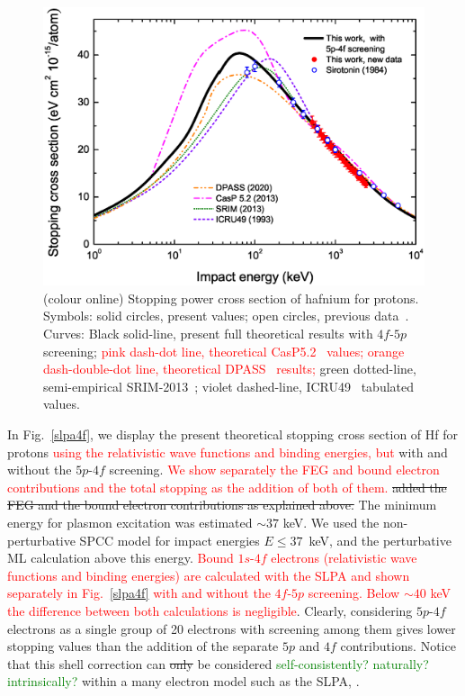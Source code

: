 \documentclass[aps,pra,reprint,superscriptaddress]{revtex4-1}
\def\clau#1{\textcolor{red}{#1}}
\def\duda#1{\textcolor{green}{#1}}
\begin{document}
\begin{figure}[!t]
\centering
\includegraphics[width=13.0cm]{Fig03_new2.eps}
\caption{(colour online) Stopping power cross section of hafnium for protons. Symbols: 
solid circles, present values; open circles, previous data~\cite{Sirotinin}. 
Curves: Black solid-line, present full theoretical results with 
$4f$-$5p$ screening; \clau{pink dash-dot line, theoretical CasP5.2~\cite{Grande,casp52} values; orange dash-double-dot line, theoretical DPASS~\cite{DPASS20} results; } green dotted-line, semi-empirical SRIM-2013~\cite{Ziegler01}; violet dashed-line, ICRU49~\cite{ICRU49} tabulated values.}
\label{F03}
\end{figure}

In Fig.~\ref{slpa4f}, we display the present theoretical stopping cross
section of Hf for protons \clau{using the relativistic wave functions and binding energies, but} with and without the $5p$-$4f$ screening. \clau{We show separately the FEG and bound electron contributions and the total stopping as the addition of both of them.}
\st{added the FEG and the bound electron contributions as explained above. }
The minimum energy for plasmon excitation was estimated $\sim 37$ keV. We
used the non-perturbative SPCC model for impact energies $E \leq 37$~keV, 
and the perturbative ML calculation above this energy. \clau{Bound $1s$-$4f$ electrons (relativistic wave functions and binding energies) are calculated with the SLPA and shown separately in Fig.~\ref{slpa4f} with and without the $4f$-$5p$ screening. Below $\sim 40$ keV the difference between both calculations is negligible}. Clearly, 
considering $5p$-$4f$ electrons as a single group of 20 electrons with 
screening among them gives lower stopping values than the addition of 
the separate $5p$ and $4f$ contributions. Notice that this shell 
correction can \st{only} be considered \duda{self-consistently? naturally? intrinsically?} within a many electron model such as the SLPA, .
\end{document}
